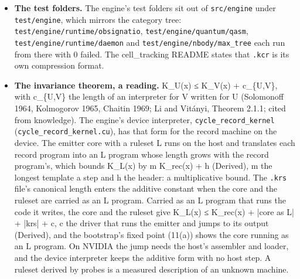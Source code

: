 \begin{enumerate}
\begin{itemize}
\begin{enumerate}
\begin{itemize}
\item \textbf{The test folders.} The engine's test folders sit out of \texttt{src/\allowbreak{}engine} under \texttt{test/\allowbreak{}engine}, which mirrors the category tree: \texttt{test/\allowbreak{}engine/\allowbreak{}runtime/\allowbreak{}obsignatio}, \texttt{test/\allowbreak{}engine/\allowbreak{}quantum/\allowbreak{}qasm}, \texttt{test/\allowbreak{}engine/\allowbreak{}runtime/\allowbreak{}daemon} and \texttt{test/\allowbreak{}engine/\allowbreak{}nbody/\allowbreak{}max\_\allowbreak{}tree} each run from there with 0 failed. The cell\_\allowbreak{}tracking README states that \texttt{.\allowbreak{}kcr} is its own compression format.
\item \textbf{The invariance theorem, a reading.} K\_\allowbreak{}U(x) ≤ K\_\allowbreak{}V(x) + c\_\allowbreak{}\{U,V\}, with c\_\allowbreak{}\{U,V\} the length of an interpreter for V written for U (Solomonoff 1964, Kolmogorov 1965, Chaitin 1969; Li and Vitányi, Theorem 2.1.1; cited from knowledge). The engine's device interpreter, \texttt{cycle\_\allowbreak{}record\_\allowbreak{}kernel} (\texttt{cycle\_\allowbreak{}record\_\allowbreak{}kernel.\allowbreak{}cu}), has that form for the record machine on the device. The emitter core with a ruleset L runs on the host and translates each record program into an L program whose length grows with the record program's, which bounds K\_\allowbreak{}L(x) by m K\_\allowbreak{}rec(x) + h (Derived), m the longest template a step and h the header: a multiplicative bound. The \texttt{.\allowbreak{}krs} file's canonical length enters the additive constant when the core and the ruleset are carried as an L program. Carried as an L program that runs the code it writes, the core and the ruleset give K\_\allowbreak{}L(x) ≤ K\_\allowbreak{}rec(x) + |core as L| + |krs| + c, c the driver that runs the emitter and jumps to its output (Derived), and the bootstrap's fixed point (11(a)) shows the core running as an L program. On NVIDIA the jump needs the host's assembler and loader, and the device interpreter keeps the additive form with no host step. A ruleset derived by probes is a measured description of an unknown machine.

\end{itemize}
\end{enumerate}
\end{itemize}
\end{enumerate}

